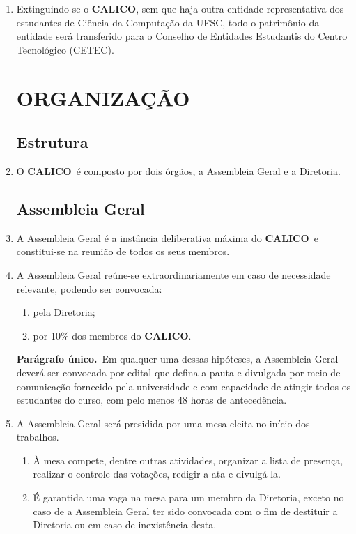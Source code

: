 \documentclass[12pt,a4paper]{article}
\newcommand{\calico}{\textbf{CALICO}}
\newcommand{\parun}{\textbf{Parágrafo único.}\ }
\begin{document}
\begin{enumerate}[label=\textbf{Art. \arabic*º.}]
    \item Extinguindo-se o \calico, sem que haja outra entidade representativa dos estudantes de Ciência da Computação da UFSC, todo o patrimônio da entidade será transferido para o Conselho de Entidades Estudantis do Centro Tecnológico (CETEC).
    
\section{ORGANIZAÇÃO}
    
\subsection{Estrutura}

    \item O \calico\ é composto por dois órgãos, a Assembleia Geral e a Diretoria.
    
\subsection{Assembleia Geral}

    \item A Assembleia Geral é a instância deliberativa máxima do \calico\ e constitui-se na reunião de todos os seus membros.

    \item A Assembleia Geral reúne-se extraordinariamente em caso de necessidade relevante, podendo ser convocada:

    \begin{enumerate}[label=\textbf{\Roman* - }]
        \item pela Diretoria;
        \item por 10\% dos membros do \calico.
    \end{enumerate}

    \parun Em qualquer uma dessas hipóteses, a Assembleia Geral deverá ser convocada por edital que defina a pauta e divulgada por meio de comunicação fornecido pela universidade e com capacidade de atingir todos os estudantes do curso, com pelo menos 48 horas de antecedência.

    \item A Assembleia Geral será presidida por uma mesa eleita no início dos trabalhos.
    
     \begin{enumerate}[label=\textbf{\S\arabic*º.}]
        \item{À mesa compete, dentre outras atividades, organizar a lista de presença, realizar o controle das votações, redigir a ata e divulgá-la.}
        \item{É garantida uma vaga na mesa para um membro da Diretoria, exceto no caso de a Assembleia Geral ter sido convocada com o fim de destituir a Diretoria ou em caso de inexistência desta.}
     \end{enumerate}
    

\end{enumerate}
\end{document}
